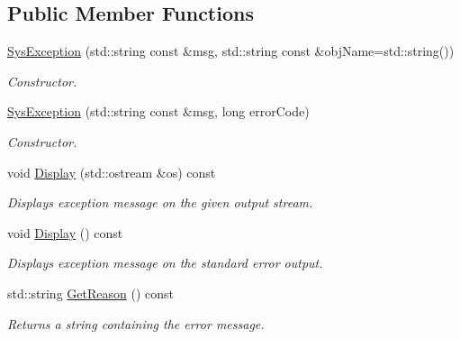 \subsection*{Public Member Functions}
\begin{DoxyCompactItemize}
\item 
\hyperlink{class_common_1_1_sys_exception_ada013850f3777f267a722a079cdd73bb}{Sys\-Exception} (std\-::string const \&msg, std\-::string const \&obj\-Name=std\-::string())
\begin{DoxyCompactList}\small\item\em Constructor. \end{DoxyCompactList}\item 
\hyperlink{class_common_1_1_sys_exception_a817906c853895e73d19a523dbd9ee3ea}{Sys\-Exception} (std\-::string const \&msg, long error\-Code)
\begin{DoxyCompactList}\small\item\em Constructor. \end{DoxyCompactList}\item 
void \hyperlink{class_common_1_1_sys_exception_a9d45fb4b1344896490b926ccb976a7a6}{Display} (std\-::ostream \&os) const 
\begin{DoxyCompactList}\small\item\em Displays exception message on the given output stream. \end{DoxyCompactList}\item 
\hypertarget{class_common_1_1_sys_exception_a4237f4bf193d2ef321c1a0a6933186c7}{void \hyperlink{class_common_1_1_sys_exception_a4237f4bf193d2ef321c1a0a6933186c7}{Display} () const }\label{class_common_1_1_sys_exception_a4237f4bf193d2ef321c1a0a6933186c7}

\begin{DoxyCompactList}\small\item\em Displays exception message on the standard error output. \end{DoxyCompactList}\item 
\hypertarget{class_common_1_1_sys_exception_ae5f3e60dfa392b0901bc550fd51a2488}{std\-::string \hyperlink{class_common_1_1_sys_exception_ae5f3e60dfa392b0901bc550fd51a2488}{Get\-Reason} () const }\label{class_common_1_1_sys_exception_ae5f3e60dfa392b0901bc550fd51a2488}

\begin{DoxyCompactList}\small\item\em Returns a string containing the error message. \end{DoxyCompactList}\end{DoxyCompactItemize}
